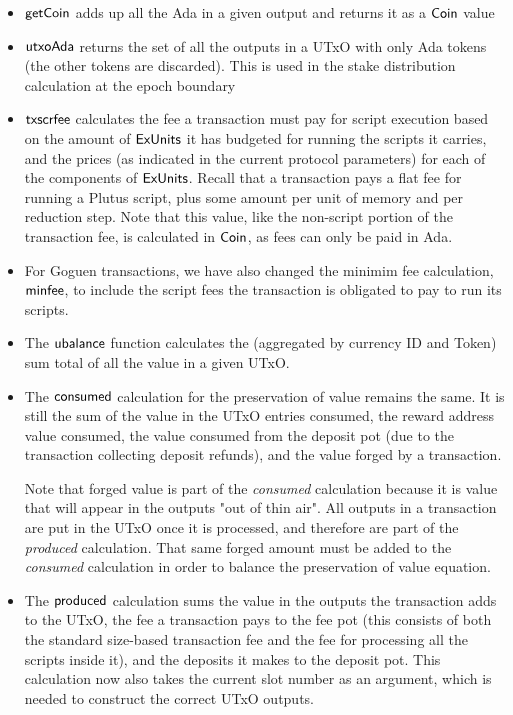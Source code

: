 \begin{itemize}

  \item $\mathsf{getCoin}$ adds up all the Ada in a given output and returns it as a
  $\mathsf{Coin}$ value

  \item $\mathsf{utxoAda}$ returns the set of all the outputs in a UTxO with only Ada
  tokens (the other tokens are discarded). This is used in the stake distribution
  calculation at the epoch boundary

  \item $\mathsf{txscrfee}$ calculates the fee a transaction must pay for script
  execution based on the amount of $\mathsf{ExUnits}$ it has budgeted for running the
  scripts it carries, and the prices (as indicated in the current protocol parameters)
  for each of the components of $\mathsf{ExUnits}$. Recall that a transaction pays a flat
  fee for running a Plutus script, plus some amount per unit of memory
  and per reduction step.
  Note that this value,
  like the non-script portion of the transaction fee, is calculated in $\mathsf{Coin}$,
  as fees can only be paid in Ada.

  \item For Goguen transactions, we have also changed the minimim fee calculation, $\mathsf{minfee}$,
  to include the script fees the transaction is obligated to pay to run its
  scripts.

  \item
    The $\mathsf{ubalance}$ function calculates the (aggregated by currency ID and
    Token) sum total of all the value in a given UTxO.

  \item The $\mathsf{consumed}$ calculation for the preservation of value remains the
  same. It is still the sum of the value in the UTxO entries consumed, the
   reward address value consumed, the
   value consumed from the deposit pot (due
   to the transaction collecting deposit refunds),
   and the value forged by a transaction.

   Note that forged value is part of the \textit{consumed} calculation because
   it is value that will appear in the outputs "out of thin air". All outputs
   in a transaction are put in the UTxO once it is processed, and therefore
   are part of the \textit{produced} calculation. That same forged amount must be
   added to the \textit{consumed} calculation in order to balance the preservation
   of value equation.

  \item The $\mathsf{produced}$ calculation sums the value in the outputs the
  transaction adds to the UTxO, the fee a transaction pays
  to the fee pot (this consists of both the standard size-based transaction fee
  and the fee for processing all the scripts inside it),
  and the deposits it makes
  to the deposit pot.
  This calculation now also takes the current slot number as an argument, which is
  needed to construct the correct UTxO outputs.


\end{itemize}
